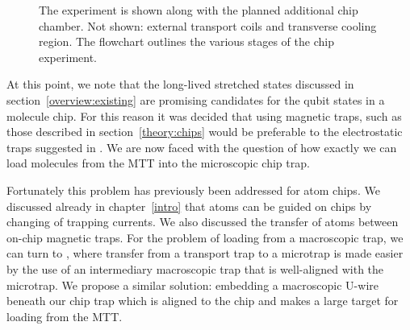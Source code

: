 \begin{figure}[htb]
\begin{subfigure}{\textwidth}
  \centering
{}
\end{subfigure}

  \caption[The \CaF{} and \CaF{} chip experiment]{
    The \CaF{} experiment is shown along with the planned additional chip
    chamber. Not shown: external transport coils and transverse cooling region.
  The flowchart outlines the various stages of the chip experiment.}
  \label{overview:fig:vacuumsystem}
\end{figure}

At this point, we note that the long-lived stretched states discussed in
section~\ref{overview:existing} are promising candidates for the qubit states
in a molecule chip. For this reason it was decided that using magnetic traps,
such as those described in section~\ref{theory:chips} would be preferable to the
electrostatic traps suggested in . We are now faced with
the question of how exactly we can load molecules from the MTT into the
microscopic chip trap.

Fortunately this problem has previously been addressed for atom chips. We
discussed already in chapter~\ref{intro} that atoms can be guided on chips by
changing of trapping currents. We also discussed the transfer of
atoms between on-chip magnetic traps. For the problem of loading from a
macroscopic trap, we can turn to , where transfer from a
transport trap to a microtrap is made easier by the use of an intermediary
macroscopic trap that is well-aligned with the microtrap.
We propose a similar solution: embedding a macroscopic U-wire beneath our chip
trap which is aligned to the chip and makes a large target for loading from the
MTT.


